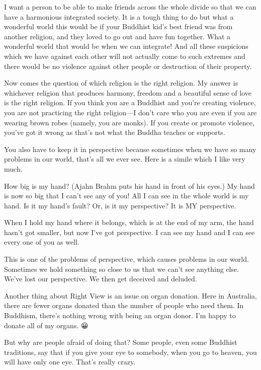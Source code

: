 \documentclass[12pt, openany]{book}
\begin{document}
I want a person to be able to make friends across the whole divide so that we can have a harmonious integrated society. It is a tough thing to do but what a wonderful world this would be if your Buddhist kid’s best friend was from another religion, and they loved to go out and have fun together. What a wonderful world that would be when we can integrate! And all these suspicions which we have against each other will not actually come to such extremes and there would be no violence against other people or destruction of their property. 

Now comes the question of which religion is the right religion. My answer is whichever religion that produces harmony, freedom and a beautiful sense of love is the right religion. If you think you are a Buddhist and you’re creating violence, you are not practicing the right religion—I don’t care who you are even if you are wearing brown robes (namely, you are monks). If you create or promote violence, you’ve got it wrong as that’s not what the Buddha teaches or supports. 

You also have to keep it in perspective because sometimes when we have so many problems in our world, that’s all we ever see. Here is a simile which I like very much. 

How big is my hand? (Ajahn Brahm puts his hand in front of his eyes.) My hand is now so big that I can’t see any of you! All I can see in the whole world is my hand. Is it my hand’s fault? Or, is it my perspective? It is MY perspective. 

When I hold my hand where it belongs, which is at the end of my arm, the hand hasn’t got smaller, but now I’ve got perspective. I can see my hand and I can see every one of you as well. 

This is one of the problems of perspective, which causes problems in our world. Sometimes we hold something so close to us that we can’t see anything else. We’ve lost our perspective. We then get deceived and deluded. 

Another thing about Right View is an issue on organ donation. Here in Australia, there are fewer organs donated than the number of people who need them. In Buddhism, there’s nothing wrong with being an organ donor. I’m happy to donate all of my organs. 😀

But why are people afraid of doing that? Some people, even some Buddhist traditions, say that if you give your eye to somebody, when you go to heaven, you will have only one eye. That’s really crazy. 
\end{document}
